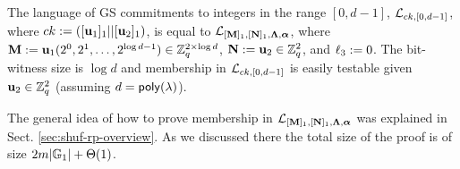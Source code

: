 \begin{example}
The language of GS commitments to integers in the range $[0,d-1]$, $\mathcal{L}_{ck,[0,d-1]}$, where $ck:=([\mathbf{u}_1]_1||[\mathbf{u}_2]_1)$, is equal to $\mathcal{L}_{[\mathbf{{M}}]_1,[\mathbf{{N}}]_1,\mathbf{{\Lambda}},{\boldsymbol \alpha}}$, where
$\mathbf{{M}}:=\mathbf{u}_1(2^0,2^1,\ldots,2^{\log d-1})\in\mathbb{Z}_q^{2\times \log d}$, $\mathbf{{N}}:=\mathbf{u}_2\in\mathbb{Z}_q^{2}$, and ${\ell_3}:=0$. The bit-witness size is $\log d$ and membership in $\mathcal{L}_{ck,[0,d-1]}$ is easily testable given $\mathbf{u}_2 \in \mathbb{Z}_q^2$
(assuming $d=\mathsf{poly}(\lambda)$). 
\end{example}

The general idea of how to prove membership in $\mathcal{L}_{[\mathbf{{M}}]_1,[\mathbf{{N}}]_1,\mathbf{{\Lambda}},{\boldsymbol \alpha}}$ was explained in Sect. \ref{sec:shuf-rp-overview}. As we discussed there the total size of the proof is of size $2{m}|\mathbb{G}_1|+\Theta(1)$.

